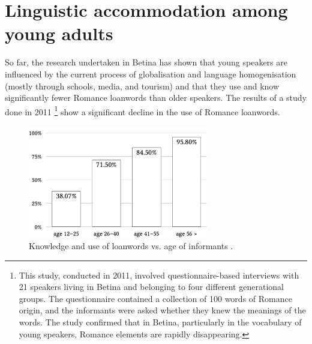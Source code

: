 \documentclass[output=paper]{LSP/langsci}
\begin{document}
\section{Linguistic accommodation among young adults}

So far, the research undertaken in Betina has shown that young speakers are influenced by the current process of globalisation and language homogenisation (mostly through schools, media, and tourism) and that they use and know significantly fewer Romance loanwords than older speakers. The results of a study done in 2011 \citep{skevin_izmedu_2012}\footnote{This study, conducted in 2011, involved questionnaire-based interviews with 21 speakers living in Betina and belonging to four different generational groups. The questionnaire contained a collection of 100 words of Romance origin, and the informants were asked whether they knew the meanings of the words. The study confirmed that in Betina, particularly in the vocabulary of young speakers, Romance elements are rapidly disappearing.} show a significant decline in the use of Romance loanwords. 
  
\begin{figure} 
\includegraphics[width=0.7\textwidth]{illustrations/skevin_fig1.pdf}
\caption{Knowledge and use of  loanwords vs. age of informants \citep[175]{skevin_izmedu_2012}.}
\label{fig:skevin:1}
\end{figure} 
\end{document}
